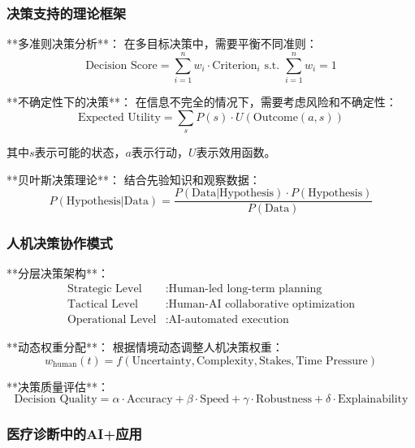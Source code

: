 \subsubsection{决策支持的理论框架} %

**多准则决策分析**：
在多目标决策中，需要平衡不同准则：
\begin{equation}
\text{Decision Score} = \sum_{i=1}^n w_i \cdot \text{Criterion}_i \text{ s.t. } \sum_{i=1}^n w_i = 1
\end{equation}

**不确定性下的决策**：
在信息不完全的情况下，需要考虑风险和不确定性：
\begin{equation}
\text{Expected Utility} = \sum_{s} P(s) \cdot U(\text{Outcome}(a, s))
\end{equation}

其中$s$表示可能的状态，$a$表示行动，$U$表示效用函数。

**贝叶斯决策理论**：
结合先验知识和观察数据：
\begin{equation}
P(\text{Hypothesis}|\text{Data}) = \frac{P(\text{Data}|\text{Hypothesis}) \cdot P(\text{Hypothesis})}{P(\text{Data})}
\end{equation}

\subsubsection{人机决策协作模式} %

**分层决策架构**：
\begin{align}
\text{Strategic Level} &: \text{Human-led long-term planning} \\
\text{Tactical Level} &: \text{Human-AI collaborative optimization} \\
\text{Operational Level} &: \text{AI-automated execution}
\end{align}

**动态权重分配**：
根据情境动态调整人机决策权重：
\begin{equation}
w_{\text{human}}(t) = f(\text{Uncertainty}, \text{Complexity}, \text{Stakes}, \text{Time Pressure})
\end{equation}

**决策质量评估**：
\begin{equation}
\text{Decision Quality} = \alpha \cdot \text{Accuracy} + \beta \cdot \text{Speed} + \gamma \cdot \text{Robustness} + \delta \cdot \text{Explainability}
\end{equation}

\subsubsection{医疗诊断中的AI+应用} %

